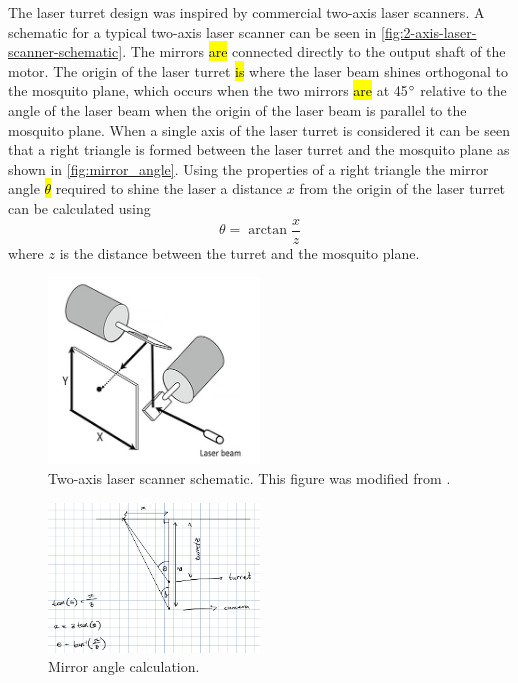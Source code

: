 The laser turret design was inspired by commercial two-axis laser scanners. A schematic for a typical two-axis laser scanner can be seen in \autoref{fig:2-axis-laser-scanner-schematic}. The mirrors \hl{are} connected directly to the output shaft of the motor. The origin of the laser turret \hl{is} where the laser beam shines orthogonal to the mosquito plane, which occurs when the two mirrors \hl{are} at 45$^{\circ}$ relative to the angle of the laser beam when the origin of the laser beam is parallel to the mosquito plane. When a single axis of the laser turret is considered it can be seen that a right triangle is formed between the laser turret and the mosquito plane as shown in \autoref{fig:mirror_angle}. Using the properties of a right triangle the mirror angle \hl{$\theta$} required to shine the laser a distance $x$ from the origin of the laser turret can be calculated using
\begin{equation}
    \theta = \arctan{\frac{x}{z}}
    \label{eq:mirror_angle}
\end{equation}
where $z$ is the distance between the turret and the mosquito plane.

\begin{figure}[h]
    \centering
    \includegraphics[width=0.5\textwidth]{figures/2_axis_laser_scanner.png}
    \caption{Two-axis laser scanner schematic. This figure was modified from \cite{2-axis-scanner-schematic}.}
    \label{fig:2-axis-laser-scanner-schematic}
\end{figure}

\begin{figure}[h]
    \centering
    \includegraphics[width=0.5\textwidth]{figures/mirror_angle.png}
    \caption{Mirror angle calculation.}
    \label{fig:mirror_angle}
\end{figure}

